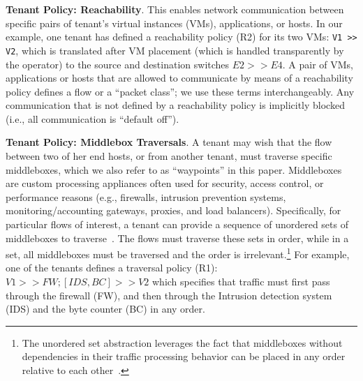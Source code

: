 \begin{compactitemize}
\item \textbf{Tenant Policy: Reachability}. This enables network communication
  between specific pairs of tenant's virtual instances (VMs),
  applications, or hosts.  In our example, one tenant has defined a
  reachability policy (R2) for its two VMs: \texttt{V1 >> V2}, which
  is translated after VM placement (which is handled transparently by
  the operator) to the source and destination switches
   $E2 >> E4$. A pair of VMs, applications or hosts
  that are allowed to communicate by means of a reachability policy
  defines a flow or a ``packet class''; we use these terms
  interchangeably. Any communication that is not defined by a
  reachability policy is implicitly blocked (i.e., all communication
  is ``default off'').
  
\item \textbf{Tenant Policy: Middlebox Traversals}. A tenant may wish that the flow
  between two of her end hosts, or from another tenant, must traverse
  specific middleboxes, which we also refer to as ``waypoints'' in
  this paper. Middleboxes are custom processing appliances often used
  for security, access control, or performance reasons (e.g.,
  firewalls, intrusion prevention systems, monitoring/accounting
  gateways, proxies, and load balancers). Specifically, for particular
  flows of interest, a tenant can provide a sequence of unordered sets
  of middleboxes
  to traverse~\cite{pga}. The flows must traverse these sets in order,
  while in a set, all middleboxes must be traversed and the order is
  irrelevant.\footnote{The unordered set abstraction leverages the
    fact that middleboxes without dependencies in their traffic
    processing behavior can be placed in any order relative to each
    other~\cite{pga}.} For example, one of the tenants defines a
  traversal policy (R1): $V1 >> FW; [IDS,BC] >> V2$ which specifies
  that traffic must first pass through the firewall (FW), and then
  through the Intrusion detection system (IDS) and the byte counter
  (BC) in any order.



\end{compactitemize}
